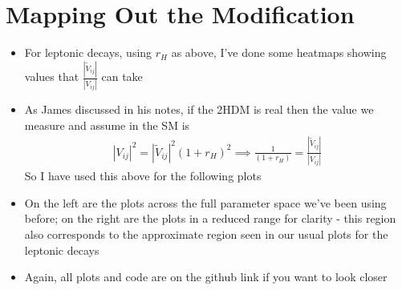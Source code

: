 \documentclass[11pt]{article}
\newcommand{\tVV}{\frac{|\tilde{V}_{ij}|}{|V_{ij}|}}
\begin{document}
\section{Mapping Out the Modification}
\begin{itemize}
    \item For leptonic decays, using $r_H$ as above, I've done some heatmaps showing values that $\tVV$ can take
    \item As James discussed in his notes, if the 2HDM is real then the value we measure and assume in the SM is
        \begin{align*}
            |V_{ij}|^2 = |\tilde{V}_{ij}|^2(1+r_H)^2 \implies \frac{1}{(1+r_H)} = \tVV
        \end{align*}
        So I have used this above for the following plots
    \item On the left are the plots across the full parameter space we've been using before; on the right are the plots in a reduced range for clarity - this region also corresponds to the approximate region seen in our usual plots for the leptonic decays
    \item Again, all plots and code are on the github link if you want to look closer
\end{itemize}
\end{document}
